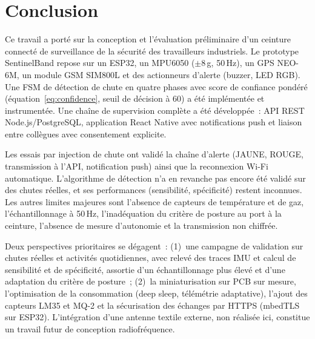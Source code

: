 \documentclass[12pt,a4paper]{article}
\renewcommand{\_}{\textunderscore\allowbreak}
\begin{document}
\section{Conclusion}

Ce travail a porté sur la conception et l'évaluation préliminaire d'un ceinture connecté de surveillance de la sécurité des travailleurs industriels. Le prototype SentinelBand repose sur un ESP32, un MPU6050 ($\pm$8\,g, 50\,Hz), un GPS NEO-6M, un module GSM SIM800L et des actionneurs d'alerte (buzzer, LED RGB). Une FSM de détection de chute en quatre phases avec score de confiance pondéré (équation~\ref{eq:confidence}, seuil de décision à 60) a été implémentée et instrumentée. Une chaîne de supervision complète a été développée~: API REST Node.js/PostgreSQL, application React Native avec notifications push et liaison entre collègues avec consentement explicite.

Les essais par injection de chute ont validé la chaîne d'alerte (JAUNE, ROUGE, transmission à l'API, notification push) ainsi que la reconnexion Wi-Fi automatique. L'algorithme de détection n'a en revanche pas encore été validé sur des chutes réelles, et ses performances (sensibilité, spécificité) restent inconnues. Les autres limites majeures sont l'absence de capteurs de température et de gaz, l'échantillonnage à 50\,Hz, l'inadéquation du critère de posture au port à la ceinture, l'absence de mesure d'autonomie et la transmission non chiffrée.

Deux perspectives prioritaires se dégagent~: (1)~une campagne de validation sur chutes réelles et activités quotidiennes, avec relevé des traces IMU et calcul de sensibilité et de spécificité, assortie d'un échantillonnage plus élevé et d'une adaptation du critère de posture~; (2)~la miniaturisation sur PCB sur mesure, l'optimisation de la consommation (deep sleep, télémétrie adaptative), l'ajout des capteurs LM35 et MQ-2 et la sécurisation des échanges par HTTPS (mbedTLS sur ESP32). L'intégration d'une antenne textile externe, non réalisée ici, constitue un travail futur de conception radiofréquence.
\end{document}
